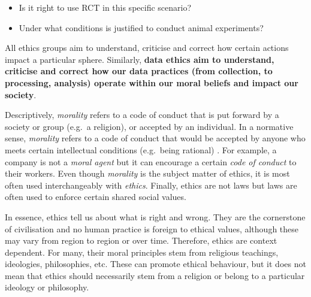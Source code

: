 \documentclass[
]{book}
\providecommand{\tightlist}{%
  \setlength{\itemsep}{0pt}\setlength{\parskip}{0pt}}
\begin{document}
\begin{itemize}
\tightlist
\item
  Is it right to use RCT in this specific scenario?
\item
  Under what conditions is justified to conduct animal experiments?
\end{itemize}

All ethics groups aim to understand, criticise and correct how certain actions impact a particular sphere. Similarly, \textbf{data ethics aim to understand, criticise and correct how our data practices (from collection, to processing, analysis) operate within our moral beliefs and impact our society}.

Descriptively, \emph{morality} refers to a code of conduct that is put forward by a society or group (e.g.~a religion), or accepted by an individual. In a normative sense, \emph{morality} refers to a code of conduct that would be accepted by anyone who meets certain intellectual conditions (e.g.~being rational) \citep{sep-morality-definition}. For example, a company is not a \emph{moral agent} but it can encourage a certain \emph{code of conduct} to their workers. Even though \emph{morality} is the subject matter of ethics, it is most often used interchangeably with \emph{ethics}. Finally, ethics are not laws but laws are often used to enforce certain shared social values.

In essence, ethics tell us about what is right and wrong. They are the cornerstone of civilisation and no human practice is foreign to ethical values, although these may vary from region to region or over time. Therefore, ethics are context dependent. For many, their moral principles stem from religious teachings, ideologies, philosophies, etc. These can promote ethical behaviour, but it does not mean that ethics should necessarily stem from a religion or belong to a particular ideology or philosophy.
\end{document}
